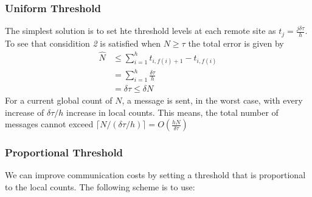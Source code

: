 \documentclass{article}
\begin{document}
\subsubsection*{Uniform Threshold}
The simplest solution is to set hte threshold levels at each remote site as $t_j = \frac{j\delta \tau}{h}$. To see that considition \textit{2} is satisfied when $N\geq \tau$ the total error is given by 
\begin{align*}
    \hat{N} &\leq \sum_{i=1}^{h}t_{i,f(i)+1} - t_{i,f(i)} \\
    &= \sum_{i=1}^{h}\frac{\delta\tau}{h} \\ 
    &= \delta\tau \leq \delta N
\end{align*}
For a current global count of $N$, a message is sent, in the worst case, with every increase of $\delta \tau / h$ increase in local counts. This means, the total number of messages cannot exceed $\lceil N / (\delta \tau / h) \rceil = O(\frac{hN}{\delta\tau})$


\subsubsection*{Proportional Threshold}

We can improve communication costs by setting a threshold that is proportional to the local counts. The following scheme is to use: 
\end{document}
